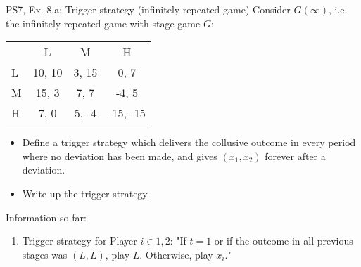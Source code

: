 \begin{frame}{PS7, Ex. 8.a: Trigger strategy (infinitely repeated game)}
    Consider $G(\infty)$, i.e. the infinitely repeated game with stage game $G$: \vspace{-6pt}
    \begin{table}
      \begin{tabular}{l|c|c|c|}
        \multicolumn{1}{c}{} & \multicolumn{1}{c}{L} & \multicolumn{1}{c}{M} & \multicolumn{1}{c}{H} \\\cline{2-4}
        L & 10, 10 & 3, 15 & 0, 7 \\\cline{2-4}
        M & 15, 3 & 7, 7 & -4, 5 \\\cline{2-4}
        H & 7, 0 & 5, -4 & -15, -15 \\\cline{2-4}
      \end{tabular}
    \end{table}
    \begin{itemize}
      \item[(a)] Define a trigger strategy which delivers the collusive outcome in every period where no deviation has been made, and gives $(x_1, x_2)$ forever after a deviation.
    \end{itemize}
    \begin{multicols}{2}
      \begin{itemize}
        \item[(Step a)] Write up the trigger strategy.
      \end{itemize}
      \vfill\null\columnbreak
      Information so far:
      \begin{enumerate}
        \item Trigger strategy for Player $i\in1,2$: "If $t=1$ or if the outcome in all previous stages was $(L,L)$, play $L$. Otherwise, play $x_i$."
      \end{enumerate}
      \vfill\null
    \end{multicols}
\end{frame}

